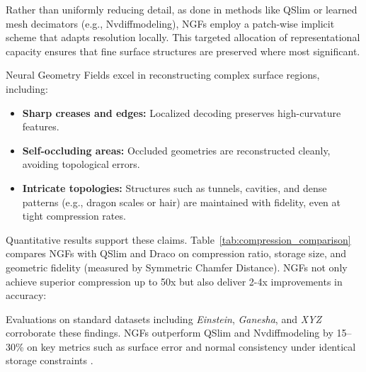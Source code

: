 Rather than uniformly reducing detail, as done in methods like QSlim or learned mesh decimators (e.g., Nvdiffmodeling), NGFs employ a patch-wise implicit scheme that adapts resolution locally. 
This targeted allocation of representational capacity ensures that fine surface structures are preserved where most significant. 

Neural Geometry Fields excel in reconstructing complex surface regions, including:
\begin{itemize}
    \item \textbf{Sharp creases and edges:} Localized decoding preserves high-curvature features.
    \item \textbf{Self-occluding areas:} Occluded geometries are reconstructed cleanly, avoiding topological errors.
    \item \textbf{Intricate topologies:} Structures such as tunnels, cavities, and dense patterns (e.g., dragon scales or hair) are maintained with fidelity, even at tight compression rates.
\end{itemize}

Quantitative results support these claims. 
Table~\ref{tab:compression_comparison} compares NGFs with QSlim and Draco on compression ratio, storage size, and geometric fidelity (measured by Symmetric Chamfer Distance). 
NGFs not only achieve superior compression up to 50x but also deliver 2-4x improvements in accuracy: 

\begin{table}[h]
\caption{Compression vs. reconstruction fidelity. Chamfer Distances are scaled by $10^5$ and normalized by the bounding box diagonal.}
\centering
{}
\label{tab:compression_comparison}
\end{table}

Evaluations on standard datasets including \textit{Einstein}, \textit{Ganesha}, and \textit{XYZ} corroborate these findings. 
NGFs outperform QSlim and Nvdiffmodeling by 15--30\% on key metrics such as surface error and normal consistency under identical storage constraints \cite{sivaram2024}.

